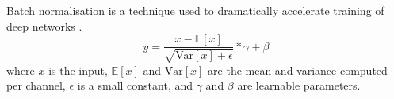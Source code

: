 \documentclass[author={Jacob Stephenson},
    degree={BSc},
    title={Robust Great Ape Species Detection in Wild Camera Trap Imagery with Promptable Concept Segmentation},
    unit={COMS30045},
    subtitle={}]{dissertation}
\begin{document}
Batch normalisation is a technique used to dramatically accelerate training of deep networks \cite{ioffe2015batchnormalizationacceleratingdeep}.
\begin{equation}
    y = \frac{x - \mathbb{E}[x]}{\sqrt{\text{Var}[x]+\epsilon}} * \gamma + \beta
\end{equation}
where $x$ is the input, $\mathbb{E}[x]$ and $\text{Var}[x]$ are the mean and variance computed per channel, $\epsilon$ is a small constant, and $\gamma$ and $\beta$ are learnable parameters.


\end{document}
